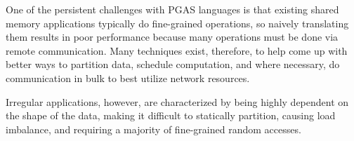 One of the persistent challenges with PGAS languages is that existing shared memory applications typically do  fine-grained operations, so naively translating them results in poor performance because many operations must be done via remote communication. Many techniques exist, therefore, to help come up with better ways to partition data, schedule computation, and where necessary, do communication in bulk to best utilize network resources.

Irregular applications, however, are characterized by being highly dependent on the shape of the data, making it difficult to statically partition, causing load imbalance, and requiring a majority of fine-grained random accesses.